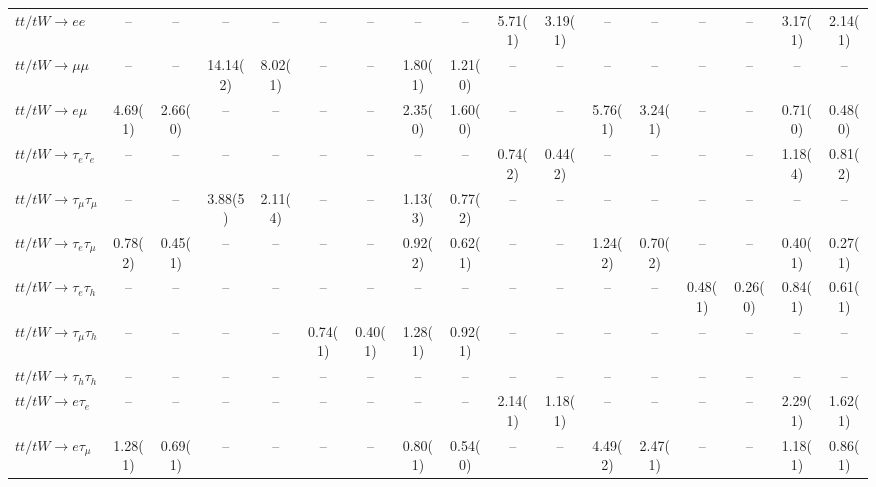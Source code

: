 \begin{sidewaystable}[p]
\begin{tabular}{|l|cc|cc|cc|cc|cc|cc|cc|cc|}
    $tt/tW \to ee$                     &    --    &    --    &    --    &    --    &    --    &    --    &    --    &    --    &  5.71(1) &  3.19(1) &    --    &    --    &    --    &    --    &  3.17(1) &  2.14(1) \\ 
    $tt/tW \to \mu\mu$                 &    --    &    --    & 14.14(2) &  8.02(1) &    --    &    --    &  1.80(1) &  1.21(0) &    --    &    --    &    --    &    --    &    --    &    --    &    --    &    --    \\ 
    $tt/tW \to e\mu$                   &  4.69(1) &  2.66(0) &    --    &    --    &    --    &    --    &  2.35(0) &  1.60(0) &    --    &    --    &  5.76(1) &  3.24(1) &    --    &    --    &  0.71(0) &  0.48(0) \\ 
    $tt/tW \to \tau_{e}\tau_{e}$       &    --    &    --    &    --    &    --    &    --    &    --    &    --    &    --    &  0.74(2) &  0.44(2) &    --    &    --    &    --    &    --    &  1.18(4) &  0.81(2) \\ 
    $tt/tW \to \tau_{\mu}\tau_{\mu}$   &    --    &    --    &  3.88(5) &  2.11(4) &    --    &    --    &  1.13(3) &  0.77(2) &    --    &    --    &    --    &    --    &    --    &    --    &    --    &    --    \\ 
    $tt/tW \to \tau_{e}\tau_{\mu}$     &  0.78(2) &  0.45(1) &    --    &    --    &    --    &    --    &  0.92(2) &  0.62(1) &    --    &    --    &  1.24(2) &  0.70(2) &    --    &    --    &  0.40(1) &  0.27(1) \\ 
    $tt/tW \to \tau_{e}\tau_{h}$       &    --    &    --    &    --    &    --    &    --    &    --    &    --    &    --    &    --    &    --    &    --    &    --    &  0.48(1) &  0.26(0) &  0.84(1) &  0.61(1) \\ 
    $tt/tW \to \tau_{\mu}\tau_{h}$     &    --    &    --    &    --    &    --    &  0.74(1) &  0.40(1) &  1.28(1) &  0.92(1) &    --    &    --    &    --    &    --    &    --    &    --    &    --    &    --    \\ 
    $tt/tW \to \tau_{h}\tau_{h}$       &    --    &    --    &    --    &    --    &    --    &    --    &    --    &    --    &    --    &    --    &    --    &    --    &    --    &    --    &    --    &    --    \\ 
    $tt/tW \to e\tau_{e}$              &    --    &    --    &    --    &    --    &    --    &    --    &    --    &    --    &  2.14(1) &  1.18(1) &    --    &    --    &    --    &    --    &  2.29(1) &  1.62(1) \\ 
    $tt/tW \to e\tau_{\mu}$            &  1.28(1) &  0.69(1) &    --    &    --    &    --    &    --    &  0.80(1) &  0.54(0) &    --    &    --    &  4.49(2) &  2.47(1) &    --    &    --    &  1.18(1) &  0.86(1) \\ 

\end{tabular}
\end{sidewaystable}
